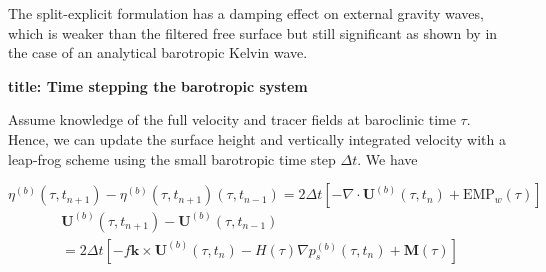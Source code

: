 
The split-explicit formulation has a damping effect on external gravity waves, which is weaker than the filtered free surface but still significant as shown by \citet{Levier2007} in the case of an analytical barotropic Kelvin wave. 


\textbf{title: Time stepping the barotropic system }

Assume knowledge of the full velocity and tracer fields at baroclinic time $\tau$. Hence, 
we can update the surface height and vertically integrated velocity with a leap-frog 
scheme using the small barotropic time step $\Delta t$. We have 

\begin{equation} \label{DYN_spg_ts_eta}
\eta^{(b)}(\tau,t_{n+1}) - \eta^{(b)}(\tau,t_{n+1}) (\tau,t_{n-1})
	= 2 \Delta t \left[-\nabla \cdot \textbf{U}^{(b)}(\tau,t_n) + \text{EMP}_w(\tau) \right] 
\end{equation}
\begin{multline} \label{DYN_spg_ts_u}
\textbf{U}^{(b)}(\tau,t_{n+1}) - \textbf{U}^{(b)}(\tau,t_{n-1})  \\
	= 2\Delta t \left[ - f \textbf{k} \times \textbf{U}^{(b)}(\tau,t_{n}) 
	- H(\tau) \nabla p_s^{(b)}(\tau,t_{n}) +\textbf{M}(\tau) \right]
\end{multline}
\

